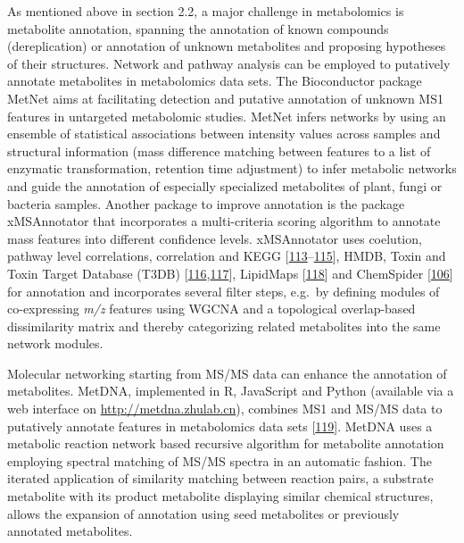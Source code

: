 \documentclass[]{article}
\begin{document}
As mentioned above in section 2.2, a major challenge in metabolomics is metabolite annotation, spanning the annotation of known compounds (dereplication) or annotation of unknown metabolites and proposing hypotheses of their structures. Network and pathway analysis can be employed to putatively annotate metabolites in metabolomics data sets. The Bioconductor package MetNet aims at facilitating detection and putative annotation of unknown MS1 features in untargeted metabolomic studies. MetNet infers networks by using an ensemble of statistical associations between intensity values across samples and structural information (mass difference matching between features to a list of enzymatic transformation, retention time adjustment) to infer metabolic networks and guide the annotation of especially specialized metabolites of plant, fungi or bacteria samples. Another package to improve annotation is the package xMSAnnotator that incorporates a multi-criteria scoring algorithm to annotate mass features into different confidence levels. xMSAnnotator uses coelution, pathway level correlations, correlation and KEGG {[}\protect\hyperlink{ref-kanehisa_2017}{113}--\protect\hyperlink{ref-kanehisa_2000}{115}{]}, HMDB, Toxin and Toxin Target Database (T3DB) {[}\protect\hyperlink{ref-lim_2010}{116},\protect\hyperlink{ref-wishart_2015}{117}{]}, LipidMaps {[}\protect\hyperlink{ref-fahy_2007}{118}{]} and ChemSpider {[}\protect\hyperlink{ref-pence_2010}{106}{]} for annotation and incorporates several filter steps, e.g.~by defining modules of co-expressing \emph{m/z} features using WGCNA and a topological overlap-based dissimilarity matrix and thereby categorizing related metabolites into the same network modules.

Molecular networking starting from MS/MS data can enhance the annotation of metabolites. MetDNA, implemented in R, JavaScript and Python (available via a web interface on \url{http://metdna.zhulab.cn}), combines MS1 and MS/MS data to putatively annotate features in metabolomics data sets {[}\protect\hyperlink{ref-shen_2019}{119}{]}. MetDNA uses a metabolic reaction network based recursive algorithm for metabolite annotation employing spectral matching of MS/MS spectra in an automatic fashion. The iterated application of similarity matching between reaction pairs, a substrate metabolite with its product metabolite displaying similar chemical structures, allows the expansion of annotation using seed metabolites or previously annotated metabolites.
\end{document}
